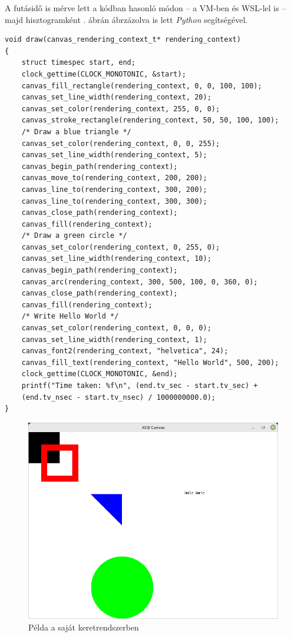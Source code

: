 A futásidő is mérve lett a kódban hasonló módon -- a VM-ben és WSL-lel is -- majd hisztogramként . ábrán ábrzázolva is lett \textit{Python} segítségével.
\begin{verbatim}
void draw(canvas_rendering_context_t* rendering_context)
{
    struct timespec start, end;
    clock_gettime(CLOCK_MONOTONIC, &start);
    canvas_fill_rectangle(rendering_context, 0, 0, 100, 100);
    canvas_set_line_width(rendering_context, 20);
    canvas_set_color(rendering_context, 255, 0, 0);
    canvas_stroke_rectangle(rendering_context, 50, 50, 100, 100);
    /* Draw a blue triangle */
    canvas_set_color(rendering_context, 0, 0, 255);
    canvas_set_line_width(rendering_context, 5);
    canvas_begin_path(rendering_context);
    canvas_move_to(rendering_context, 200, 200);
    canvas_line_to(rendering_context, 300, 200);
    canvas_line_to(rendering_context, 300, 300);
    canvas_close_path(rendering_context);
    canvas_fill(rendering_context);
    /* Draw a green circle */
    canvas_set_color(rendering_context, 0, 255, 0);
    canvas_set_line_width(rendering_context, 10);
    canvas_begin_path(rendering_context);
    canvas_arc(rendering_context, 300, 500, 100, 0, 360, 0);
    canvas_close_path(rendering_context);
    canvas_fill(rendering_context);
    /* Write Hello World */
    canvas_set_color(rendering_context, 0, 0, 0);
    canvas_set_line_width(rendering_context, 1);
    canvas_font2(rendering_context, "helvetica", 24);
    canvas_fill_text(rendering_context, "Hello World", 500, 200);
    clock_gettime(CLOCK_MONOTONIC, &end);
    printf("Time taken: %f\n", (end.tv_sec - start.tv_sec) +
    (end.tv_nsec - start.tv_nsec) / 1000000000.0);
}
\end{verbatim}

\begin{figure}[h!]
    \centering
    \includegraphics[width=8truecm]{images/own_example.png}
    \caption{Példa a saját keretrendszerben}
    \label{fig:own-example}
\end{figure}

